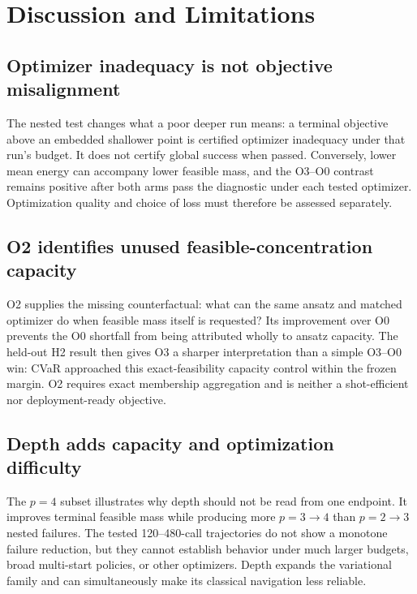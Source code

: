 \section{Discussion and Limitations}
\label{sec:discussion}
\label{sec:limitations}

\subsection*{Optimizer inadequacy is not objective misalignment}

The nested test changes what a poor deeper run means: a terminal objective
above an embedded shallower point is certified optimizer inadequacy under that
run's budget. It does not certify global success when passed. Conversely,
lower mean energy can accompany lower feasible mass, and the O3--O0 contrast
remains positive after both arms pass the diagnostic under each tested
optimizer. Optimization quality and choice of loss must therefore be assessed
separately.

\subsection*{O2 identifies unused feasible-concentration capacity}

O2 supplies the missing counterfactual: what can the same ansatz and matched
optimizer do when feasible mass itself is requested? Its improvement over O0
prevents the O0 shortfall from being attributed wholly to ansatz capacity.
The held-out H2 result then gives O3 a sharper interpretation than a simple
O3--O0 win: CVaR approached this exact-feasibility capacity control within the
frozen margin. O2 requires exact membership aggregation and is neither a
shot-efficient nor deployment-ready objective.

\subsection*{Depth adds capacity and optimization difficulty}

The $p=4$ subset illustrates why depth should not be read from one endpoint.
It improves terminal feasible mass while producing more $p=3\to4$ than
$p=2\to3$ nested failures. The tested 120--480-call trajectories do not show
a monotone failure reduction, but they cannot establish behavior under much
larger budgets, broad multi-start policies, or other optimizers. Depth expands
the variational family and can simultaneously make its classical navigation
less reliable.

